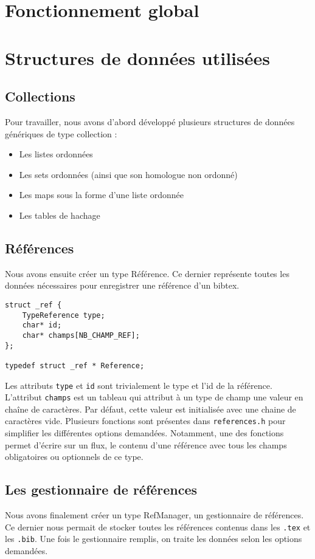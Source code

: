 \documentclass[hidelinks, a4paper,11pt,twoside,final]{article}
\begin{document}
\section{Fonctionnement global}



\section{Structures de données utilisées}
\subsection{Collections}
Pour travailler, nous avons d'abord développé plusieurs structures de données génériques de type collection :
\begin{itemize}
 \item Les listes ordonnées 
 \item Les sets ordonnées (ainsi que son homologue non ordonné)
 \item Les maps sous la forme d'une liste ordonnée 
 \item Les tables de hachage
\end{itemize}

\subsection{Références}
Nous avons ensuite créer un type Référence. Ce dernier représente toutes les données nécessaires pour enregistrer une référence d'un bibtex.
\begin{lstlisting}
struct _ref {
    TypeReference type;
    char* id;
    char* champs[NB_CHAMP_REF];
};

typedef struct _ref * Reference;
\end{lstlisting}

Les attributs \texttt{type} et \texttt{id} sont trivialement le type et l'id de la référence.
L'attribut \texttt{champs} est un tableau qui attribut à un type de champ une valeur en chaîne de caractères.
Par défaut, cette valeur est initialisée avec une chaine de caractères vide.
Plusieurs fonctions sont présentes dans \texttt{references.h} pour simplifier les différentes options demandées.
Notamment, une des fonctions permet d'écrire sur un flux, le contenu d'une référence avec tous les champs obligatoires ou optionnels de ce type.

\subsection {Les gestionnaire de références}
Nous avons finalement créer un type RefManager, un gestionnaire de références.
Ce dernier nous permait de stocker toutes les références contenus dans les \texttt{.tex} et les \texttt{.bib}. 
Une fois le gestionnaire remplis, on traite les données selon les options demandées.
\end{document}
